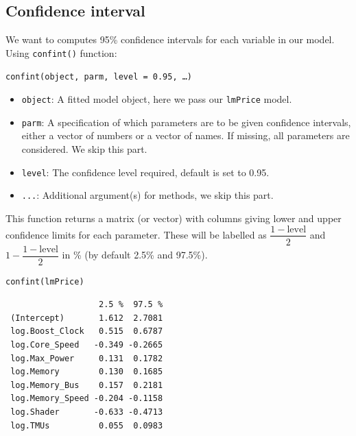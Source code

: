 \documentclass[a4paper]{article}
\begin{document}
\subsection{Confidence interval}
We want to computes 95\% confidence intervals for each variable in our model. Using \verb|confint()| function:
\begin{center}
    \verb|confint(object, parm, level = 0.95, …)|
\end{center}
\begin{itemize} 
    \item \verb|object|: A fitted model object, here we pass our \verb|lmPrice| model.
    \item \verb|parm|: A specification of which parameters are to be given confidence intervals, either a vector of numbers or a vector of names. If missing, all parameters are considered. We skip this part.
    \item \verb|level|: The confidence level required, default is set to 0.95.
    \item \verb|...|: Additional argument(s) for methods, we skip this part.
\end{itemize}
This function returns a matrix (or vector) with columns giving lower and upper confidence limits for each parameter. These will be labelled as $\dfrac{\mathrm{1 - level}}{2}$ and $1- \dfrac{\mathrm{1 - level}}{2}$ in \% (by default 2.5\% and 97.5\%).
\begin{mdframed}[leftline=false,rightline=false,backgroundcolor=lightblue!10,nobreak=false]
    \begin{verbatim}
confint(lmPrice)
    \end{verbatim}
\end{mdframed}
\begin{lstlisting}
                   2.5 %  97.5 %
 (Intercept)       1.612  2.7081
 log.Boost_Clock   0.515  0.6787
 log.Core_Speed   -0.349 -0.2665
 log.Max_Power     0.131  0.1782
 log.Memory        0.130  0.1685
 log.Memory_Bus    0.157  0.2181
 log.Memory_Speed -0.204 -0.1158
 log.Shader       -0.633 -0.4713
 log.TMUs          0.055  0.0983
\end{lstlisting}
\end{document}
